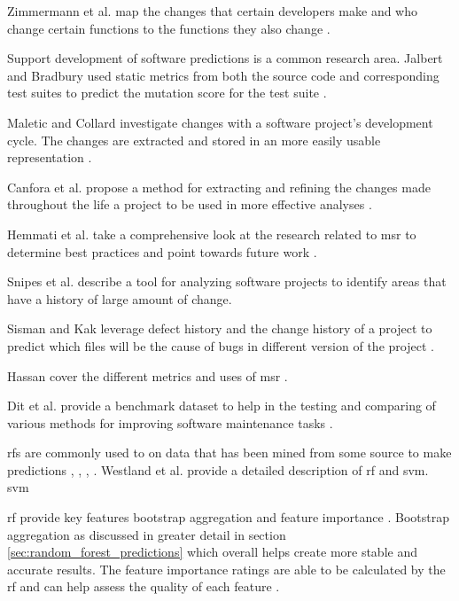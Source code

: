 Zimmermann et al. map the changes that certain developers make and who change certain functions to the functions they also change \cite{Zimmermann2005a}. 

Support development of software predictions is a common research area. Jalbert and Bradbury used static metrics from both the source code and corresponding test suites to predict the mutation score for the test suite \cite{Jalbert2012}.

Maletic and Collard investigate changes with a software project's development cycle. The changes are extracted and stored in an more easily usable representation \cite{Maletic2004}.

Canfora et al. propose a method for extracting and refining the changes made throughout the life a project to be used in more effective analyses \cite{Canfora2007c}.

Hemmati et al. take a comprehensive look at the research related to \gls{msr} to determine best practices and point towards future work \cite{Hemmati2013}.

Snipes et al. describe a tool for analyzing software projects to identify areas that have a history of large amount of change. \cite{Snipes2011}

Sisman and Kak leverage defect history and the change history of a project to predict which files will be the cause of bugs in different version of the project \cite{Sisman2012}.

Hassan cover the different metrics and uses of \gls{msr} \cite{Hassan2006}.

Dit et al. provide a benchmark dataset to help in the testing and comparing of various methods for improving software maintenance tasks \cite{Dit2013}.




\gls{rf}s are commonly used to on data that has been mined from some source to make predictions \cite{Alam2013}, \cite{Granitto2007}, \cite{Stojanova}, \cite{Yu2011}. Westland et al. provide a detailed description of \gls{rf} and \gls{svm}. \gls{svm} %

\gls{rf} provide key features bootstrap aggregation and feature importance \cite{Westland2011}. Bootstrap aggregation as discussed in greater detail in section \ref{sec:random_forest_predictions} which overall helps create more stable and accurate results. The feature importance ratings are able to be calculated by the \gls{rf} and can help assess the quality of each feature \cite{Verikas2011}.

